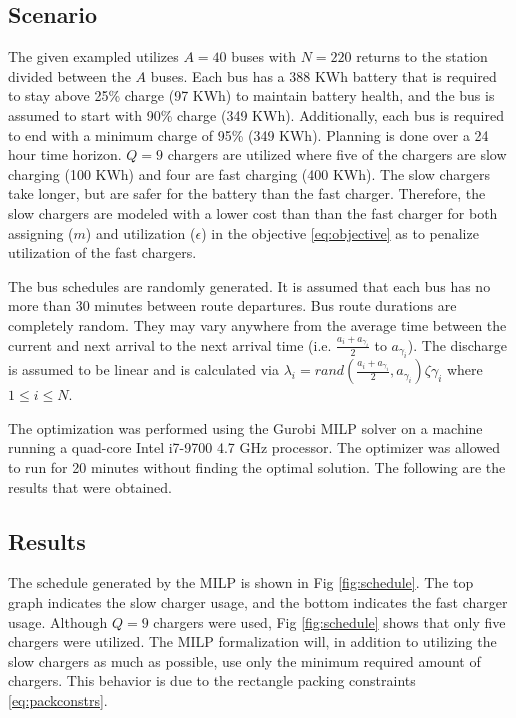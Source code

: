 \documentclass[letterpaper, 10pt, conference]{IEEEtran}
\begin{document}
\subsection{Scenario}
The given exampled utilizes \(A = 40\) buses with \(N = 220\) returns to the station divided between the \(A\) buses. Each bus has a 388 KWh battery that is required to stay above 25\% charge (97 KWh) to maintain battery health, and the bus is assumed to start with 90\% charge (349 KWh). Additionally, each bus is required to end with a minimum charge of 95\% (349 KWh). Planning is done over a 24 hour time horizon. \(Q = 9\) chargers are utilized where five of the chargers are slow charging (100 KWh) and four are fast charging (400 KWh). The slow chargers take longer, but are safer for the battery than the fast charger. Therefore, the slow chargers are modeled with a lower cost than than the fast charger for both assigning (\(m\)) and utilization (\(\epsilon\)) in the objective \eqref{eq:objective} as to penalize utilization of the fast chargers.

The bus schedules are randomly generated. It is assumed that each bus has no more than 30 minutes between route departures. Bus route durations are completely random. They may vary anywhere from the average time between the current and next arrival to the next arrival time (i.e. \(\frac{a_i + a_{\gamma_i}}{2}\) to \(a_{\gamma_i}\)). The discharge is assumed to be linear and is calculated via \(\lambda_i = rand(\frac{a_i + a_{\gamma_i}}{2},a_{\gamma_i})\zeta{\gamma_i}\) where \(1 \leq i \leq N\).

The optimization was performed using the Gurobi MILP solver \cite{Hespanha2018} on a machine running a quad-core Intel i7-9700 4.7 GHz processor. The optimizer was allowed to run for 20 minutes without finding the optimal solution. The following are the results that were obtained.

\subsection{Results}
The schedule generated by the MILP is shown in Fig \ref{fig:schedule}. The top graph indicates the slow charger usage, and the bottom indicates the fast charger usage. Although \(Q = 9\) chargers were used, Fig \ref{fig:schedule} shows that only five chargers were utilized. The MILP formalization will, in addition to utilizing the slow chargers as much as possible, use only the minimum required amount of chargers. This behavior is due to the rectangle packing constraints \eqref{eq:packconstrs}.
\end{document}
